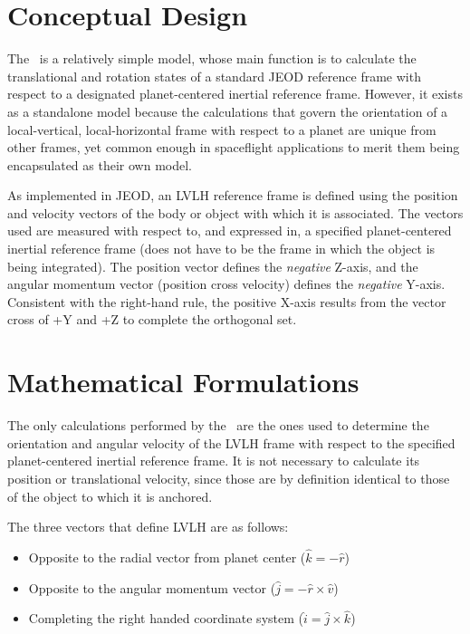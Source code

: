 \section{Conceptual Design}
The \LvlhFrameDesc\ is a relatively simple model, whose main function is to
calculate the translational and rotation states of a standard JEOD reference
frame with respect to a designated planet-centered inertial reference frame.
However, it exists as a standalone model because the calculations that
govern the orientation of a local-vertical, local-horizontal frame with
respect to a planet are unique from other frames, yet common enough in
spaceflight applications to merit them being encapsulated as their own model.

As implemented in JEOD, an LVLH reference frame is defined using the position
and velocity vectors of the body or object with which it is associated. The
vectors used are measured with respect to, and expressed in, a specified
planet-centered inertial reference frame (does not have to be the frame in
which the object is being integrated). The position vector defines the
\textit{negative} Z-axis, and the angular momentum vector (position cross
velocity) defines the \textit{negative} Y-axis. Consistent with the
right-hand rule, the positive X-axis results from the vector cross of +Y and
+Z to complete the orthogonal set.


\section{Mathematical Formulations}

The only calculations performed by the \LvlhFrameDesc\ are the ones used to
determine the orientation and angular velocity of the LVLH frame with respect
to the specified planet-centered inertial reference frame. It is not necessary
to calculate its position or translational velocity, since those are by definition
identical to those of the object to which it is anchored.

The three vectors that define LVLH are as follows:
\begin{itemize}
 \item Opposite to the radial vector from planet center ($\hat k = -\hat r$)
 \item Opposite to the angular momentum vector ($\hat j = -\hat r \times \hat v$)
 \item Completing the right handed coordinate system ($\hat i = \hat j \times \hat k$)
\end{itemize}

